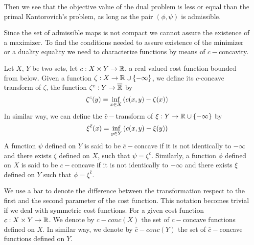 Then we see that the objective value of the dual problem is less or equal than the primal Kantorovich's problem, as long as the pair $(\phi, \psi)$ is admissible.

Since the set of admissible maps is not compact we cannot assure the existence of a maximizer. To find the conditions needed to assure existence of the minimizer or a duality equality we need to characterize functions by means of $c-$concavity.

\begin{definition}
	Let $X$, $Y$ be two sets, let $c:X\times Y \rightarrow \mathbb{R}$, a real valued cost function bounded from below. Given a function $\zeta: X\rightarrow \mathbb{R}\cup\left\lbrace -\infty \right\rbrace$, we define its $c$-concave transform of $\zeta$, the function $\zeta^c: Y\rightarrow \overline{\mathbb{R}}$ by
	\begin{equation}
	\zeta^c(y)=\inf_{x\in X}\left( c(x,y)-\zeta(x) \right)
	\end{equation}
	In similar way, we can define the $\bar{c}-$transform of $\xi: Y\rightarrow \mathbb{R}\cup\left\lbrace -\infty \right\rbrace$ by
	\begin{equation}
	\xi^{\bar{c}}(x)=\inf_{y\in Y}\left( c(x, y)-\xi(y) \right)
	\end{equation}
	A function $\psi$ defined on $Y$ is said to be $\bar c-$concave if it is not identically to $-\infty$ and there exists $\zeta$ defined on $X$, such that $\psi=\zeta^c$. Similarly, a function $\phi$ defined on $X$ is said to be $ c-$concave if it is not identically to $-\infty$ and there exists $\xi$ defined on $Y$ such that $\phi=\xi^{\bar{c}}$.
\end{definition}

We use a bar to denote the difference between the transformation respect to the first and the second parameter of the cost function. This notation becomes trivial if we deal with symmetric cost functions.
For a given cost function $c:X\times Y\rightarrow \mathbb{R}$. We denote by $c-conc(X)$ the set of $c-$concave  functions defined on $X$. In similar way, we denote by $\bar{c}-conc(Y)$ the set of $\bar{c}-$concave functions defined on $Y$. 

